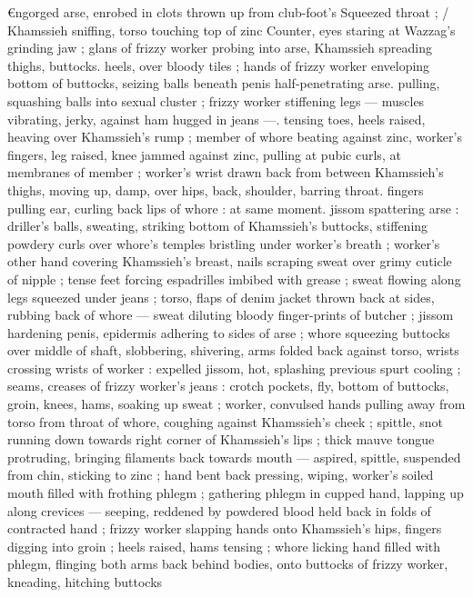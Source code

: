 €ngorged arse, enrobed in clots thrown up from club-foot's 
Squeezed throat ; {\slash} Khamssieh sniffing, torso touching top of zinc 
Counter, eyes staring at Wazzag's grinding jaw ; glans of frizzy 
worker probing into arse, Khamssieh spreading thighs, buttocks. 
heels, over bloody tiles ; hands of frizzy worker enveloping bottom 
of buttocks, seizing balls beneath penis half-penetrating arse. 
pulling, squashing balls into sexual cluster ; frizzy worker stiffening 
legs --- muscles vibrating, jerky, against ham hugged in jeans ---. 
tensing toes, heels raised, heaving over Khamssieh's rump ; member 
of whore beating against zinc, worker's fingers, leg raised, knee 
jammed against zinc, pulling at pubic curls, at membranes of 
member ; worker's wrist drawn back from between Khamssieh's 
thighs, moving up, damp, over hips, back, shoulder, barring throat. 
fingers pulling ear, curling back lips of whore : at same moment. 
jissom spattering arse : driller's balls, sweating, striking bottom of 
Khamssieh's buttocks, stiffening powdery curls over whore's temples 
bristling under worker's breath ; worker's other hand covering 
Khamssieh's breast, nails scraping sweat over grimy cuticle of nipple 
; tense feet forcing espadrilles imbibed with grease ; sweat flowing 
along legs squeezed under jeans ; torso, flaps of denim jacket 
thrown back at sides, rubbing back of whore --- sweat diluting 
bloody finger-prints of butcher ; jissom hardening penis, epidermis 
adhering to sides of arse ; whore squeezing buttocks over middle of 
shaft, slobbering, shivering, arms folded back against torso, wrists 
crossing wrists of worker : expelled jissom, hot, splashing previous 
spurt cooling ; seams, creases of frizzy worker's jeans : crotch 
pockets, fly, bottom of buttocks, groin, knees, hams, soaking up 
sweat ; worker, convulsed hands pulling away from torso from throat 
of whore, coughing against Khamssieh's cheek ; spittle, snot 
running down towards right corner of Khamssieh's lips ; thick mauve 
tongue protruding, bringing filaments back towards mouth --- 
aspired, spittle, suspended from chin, sticking to zinc ; hand bent 
back pressing, wiping, worker's soiled mouth filled with frothing 
phlegm ; gathering phlegm in cupped hand, lapping up along 
crevices --- seeping, reddened by powdered blood held back in folds 
of contracted hand ; frizzy worker slapping hands onto Khamssieh's 
hips, fingers digging into groin ; heels raised, hams tensing ; whore 
licking hand filled with phlegm, flinging both arms back behind 
bodies, onto buttocks of frizzy worker, kneading, hitching buttocks 
